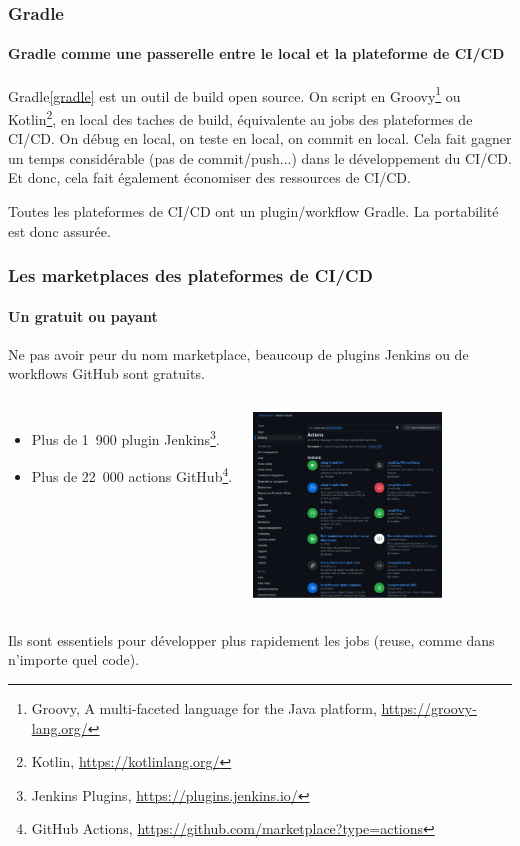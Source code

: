 \documentclass{beamer}
\begin{document}
    \begin{frame}
        \frametitle{Gradle}
        \framesubtitle{Gradle comme une passerelle entre le local et la plateforme de CI/CD}
        \transdissolve
        Gradle\cref{gradle} est un outil de build open source.
        On script en Groovy\footnote{\label{groovy}Groovy, A multi-faceted language for the Java platform, \url{https://groovy-lang.org/}} ou Kotlin\footnote{Kotlin, \url{https://kotlinlang.org/}}, en local des taches de build, équivalente au jobs des plateformes de CI/CD.
        \bigbreak
        On débug en local, on teste en local, on commit en local.
        Cela fait gagner un temps considérable (pas de commit/push...) dans le développement du CI/CD.
        Et donc, cela fait également économiser des ressources de CI/CD.
        \begin{dangercolorbox}
            Toutes les plateformes de CI/CD ont un plugin/workflow Gradle.
            La portabilité est donc assurée.
        \end{dangercolorbox}
    \end{frame}

    \begin{frame}
        \frametitle{Les marketplaces des plateformes de CI/CD}
        \framesubtitle{Un  gratuit ou payant}
        \transdissolve
        Ne pas avoir peur du nom marketplace, beaucoup de plugins Jenkins ou de workflows GitHub sont gratuits.
        \begin{columns}
            \begin{itemize}
                \item Plus de 1~900 plugin Jenkins\footnote[frame]{Jenkins Plugins, \url{https://plugins.jenkins.io/}}.
                \item Plus de 22~000 actions GitHub\footnote[frame]{GitHub Actions, \url{https://github.com/marketplace?type=actions}}.
            \end{itemize}
            \centering
            \includegraphics[width=5cm]{image/github-marketplace.png}
        \end{columns}
        Ils sont essentiels pour développer plus rapidement les jobs (reuse, comme dans n'importe quel code).
    \end{frame}
\end{document}
